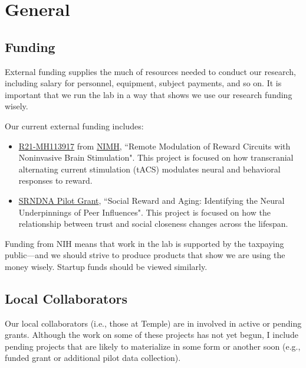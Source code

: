 \documentclass[letterpaper,12pt,oneside]{memoir}
\begin{document}
\chapter{General} %

\section{Funding}

External funding supplies the much of resources needed to conduct our research, including salary for personnel, equipment, subject payments, and so on. It is important that we run the lab in a way that shows we use our research funding wisely. 

Our current external funding includes:

\begin{itemize}

\item \href{https://projectreporter.nih.gov/Reporter_Viewsh.cfm?sl=12EECD0C478DC1D27598B8961CAA4A01A2FFCEB861BF}{R21-MH113917} from \href{https://www.nimh.nih.gov/index.shtml}{NIMH}, ``Remote Modulation of Reward Circuits with Noninvasive Brain Stimulation". This project is focused on how transcranial alternating current stimulation (tACS) modulates neural and behavioral responses to reward. 

\item \href{https://www.decisionneuroaging.network/funding/}{SRNDNA Pilot Grant}, ``Social Reward and Aging: Identifying the Neural Underpinnings of Peer Influences". This project is focused on how the relationship between trust and social closeness changes across the lifespan. 

\end{itemize}

Funding from NIH means that work in the lab is supported by the taxpaying public---and we should strive to produce products that show we are using the money wisely. Startup funds should be viewed similarly. 

\section{Local Collaborators}
Our local collaborators (i.e., those at Temple) are in involved in active or pending grants. Although the work on some of these projects has not yet begun, I include pending projects that are likely to materialize in some form or another soon (e.g., funded grant or additional pilot data collection).
\end{document}
